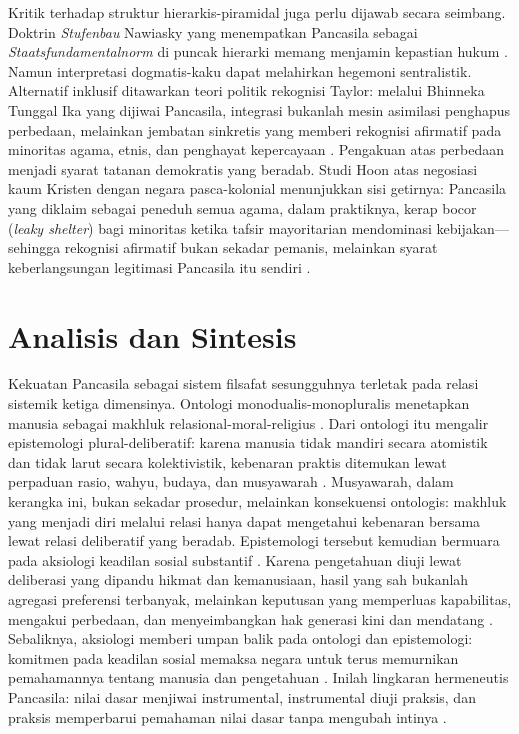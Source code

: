 \documentclass[journal]{IEEEtran}
\begin{document}
Kritik terhadap struktur hierarkis-piramidal juga perlu dijawab secara seimbang. Doktrin \textit{Stufenbau} Nawiasky yang menempatkan Pancasila sebagai \textit{Staatsfundamentalnorm} di puncak hierarki memang menjamin kepastian hukum \cite{nawiasky1948,assiddiqie2006}. Namun interpretasi dogmatis-kaku dapat melahirkan hegemoni sentralistik. Alternatif inklusif ditawarkan teori politik rekognisi Taylor: melalui Bhinneka Tunggal Ika yang dijiwai Pancasila, integrasi bukanlah mesin asimilasi penghapus perbedaan, melainkan jembatan sinkretis yang memberi rekognisi afirmatif pada minoritas agama, etnis, dan penghayat kepercayaan \cite{taylor1994,madungmere2021}. Pengakuan atas perbedaan menjadi syarat tatanan demokratis yang beradab. Studi Hoon atas negosiasi kaum Kristen dengan negara pasca-kolonial menunjukkan sisi getirnya: Pancasila yang diklaim sebagai peneduh semua agama, dalam praktiknya, kerap bocor (\textit{leaky shelter}) bagi minoritas ketika tafsir mayoritarian mendominasi kebijakan---sehingga rekognisi afirmatif bukan sekadar pemanis, melainkan syarat keberlangsungan legitimasi Pancasila itu sendiri \cite{hoon2013,taylor1994}.

\section{Analisis dan Sintesis}

Kekuatan Pancasila sebagai sistem filsafat sesungguhnya terletak pada relasi sistemik ketiga dimensinya. Ontologi monodualis-monopluralis menetapkan manusia sebagai makhluk relasional-moral-religius \cite{notonagoro1975,pristiwiyanto2021,latif2018}. Dari ontologi itu mengalir epistemologi plural-deliberatif: karena manusia tidak mandiri secara atomistik dan tidak larut secara kolektivistik, kebenaran praktis ditemukan lewat perpaduan rasio, wahyu, budaya, dan musyawarah \cite{madung2016,pristiwiyanto2021,gadamer2004}. Musyawarah, dalam kerangka ini, bukan sekadar prosedur, melainkan konsekuensi ontologis: makhluk yang menjadi diri melalui relasi hanya dapat mengetahui kebenaran bersama lewat relasi deliberatif yang beradab. Epistemologi tersebut kemudian bermuara pada aksiologi keadilan sosial substantif \cite{rawls1971,sen1999,nussbaum2011,fraser2008}. Karena pengetahuan diuji lewat deliberasi yang dipandu hikmat dan kemanusiaan, hasil yang sah bukanlah agregasi preferensi terbanyak, melainkan keputusan yang memperluas kapabilitas, mengakui perbedaan, dan menyeimbangkan hak generasi kini dan mendatang \cite{sen1999,yusa2022}. Sebaliknya, aksiologi memberi umpan balik pada ontologi dan epistemologi: komitmen pada keadilan sosial memaksa negara untuk terus memurnikan pemahamannya tentang manusia dan pengetahuan \cite{suntana2023,kim2024}. Inilah lingkaran hermeneutis Pancasila: nilai dasar menjiwai instrumental, instrumental diuji praksis, dan praksis memperbarui pemahaman nilai dasar tanpa mengubah intinya \cite{gadamer2004,ricoeur1981}.
\end{document}

